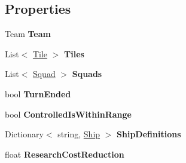 \subsection*{Properties}
\begin{DoxyCompactItemize}
\item 
\hypertarget{class_player_afa5203cae11ff60cf384d53276b8452d}{}Team {\bfseries Team}\label{class_player_afa5203cae11ff60cf384d53276b8452d}

\item 
\hypertarget{class_player_adb3a1f695a1c6dd1c6fa765416f8ad18}{}List$<$ \hyperlink{class_tile}{Tile} $>$ {\bfseries Tiles}\label{class_player_adb3a1f695a1c6dd1c6fa765416f8ad18}

\item 
\hypertarget{class_player_a859c9fdd54b6dc795b7e00a2ca14209c}{}List$<$ \hyperlink{class_squad}{Squad} $>$ {\bfseries Squads}\label{class_player_a859c9fdd54b6dc795b7e00a2ca14209c}

\item 
\hypertarget{class_player_ad2acb9043a0a07b40de6ed68b9b77901}{}bool {\bfseries Turn\+Ended}\label{class_player_ad2acb9043a0a07b40de6ed68b9b77901}

\item 
\hypertarget{class_player_afd617adb3cad5ec63bb48d8d1f6493d2}{}bool {\bfseries Controlled\+Is\+Within\+Range}\label{class_player_afd617adb3cad5ec63bb48d8d1f6493d2}

\item 
\hypertarget{class_player_a83e107d1e137e7b89eb5c2ee57dadfd0}{}Dictionary$<$ string, \hyperlink{class_ship}{Ship} $>$ {\bfseries Ship\+Definitions}\label{class_player_a83e107d1e137e7b89eb5c2ee57dadfd0}

\item 
\hypertarget{class_player_aa00ea7bf43a0aacbd7506803564a8e2a}{}float {\bfseries Research\+Cost\+Reduction}\label{class_player_aa00ea7bf43a0aacbd7506803564a8e2a}

\end{DoxyCompactItemize}


